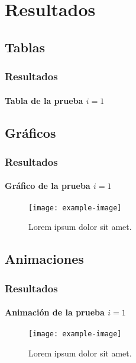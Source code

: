 \documentclass[hyperref={pdfpagelayout=SinglePage}]{beamer}
\begin{document}
\section{Resultados}

\subsection{Tablas}

\begin{frame}
\frametitle{Resultados}
\framesubtitle{Tabla de la prueba $i = 1$}
\begin{center}
\begin{table}[h]
\centering
{}
\caption{Lorem ipsum dolor sit amet.}
\end{table}
\end{center}
\end{frame}

\subsection{Gráficos}

\begin{frame}
\frametitle{Resultados}
\framesubtitle{Gráfico de la prueba $i = 1$}
\begin{figure}[H]
        \centering
        \texttt{[image: example-image]}
        \caption{Lorem ipsum dolor sit amet.}
\end{figure}
\end{frame}

\subsection{Animaciones}

\begin{frame}
\frametitle{Resultados}
\framesubtitle{Animación de la prueba $i = 1$}
\begin{figure}[H]
        \centering
        \texttt{[image: example-image]}
        \caption{Lorem ipsum dolor sit amet.}
\end{figure}
\end{frame}
\end{document}
